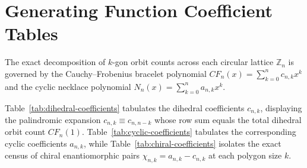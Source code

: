 \section{Generating Function Coefficient Tables}
\label{sec:coefficient-tables}

The exact decomposition of $k$-gon orbit counts across each circular lattice
$\mathbb{Z}_n$ is governed by the Cauchy--Frobenius bracelet polynomial
$CF_n(x) = \sum_{k=0}^n c_{n,k} x^k$ and the cyclic necklace polynomial
$N_n(x) = \sum_{k=0}^n a_{n,k} x^k$.

Table~\ref{tab:dihedral-coefficients} tabulates the dihedral coefficients
$c_{n,k}$, displaying the palindromic expansion $c_{n,k} \equiv c_{n, n-k}$
whose row sum equals the total dihedral orbit count $CF_n(1)$.
Table~\ref{tab:cyclic-coefficients} tabulates the corresponding cyclic
coefficients $a_{n,k}$, while Table~\ref{tab:chiral-coefficients} isolates
the exact census of chiral enantiomorphic pairs $\chi_{n,k} = a_{n,k} - c_{n,k}$
at each polygon size $k$.


